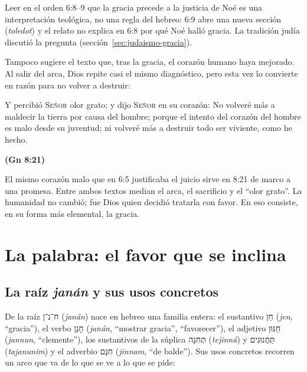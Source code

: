 \documentclass[11pt,letterpaper]{article}
\newcommand{\heb}[1]{\mbox{\foreignlanguage{hebrew}{#1}}}
\newcommand{\SENOR}{\textsc{Señor}}
\newcommand{\fuente}[1]{\par\hfill{\upshape\bfseries\small\textcolor{azul}{#1}}}
\begin{document}
\begin{nota}[Precisión]
Leer en el orden 6:8--9 que la gracia precede a la justicia de Noé es una interpretación teológica, no una regla del hebreo: 6:9 abre una nueva sección (\emph{toledot}) y el relato no explica en 6:8 por qué Noé halló gracia. La tradición judía discutió la pregunta (sección~\ref{sec:judaismo-gracia}).
\end{nota}

Tampoco sugiere el texto que, tras la gracia, el corazón humano haya mejorado. Al salir del arca, Dios repite casi el mismo diagnóstico, pero esta vez lo convierte en razón para no volver a destruir:

\begin{cita}Y percibió \SENOR{} olor grato; y dijo \SENOR{} en su corazón: No volveré más a maldecir la tierra por causa del hombre; porque el intento del corazón del hombre es malo desde su juventud; ni volveré más a destruir todo ser viviente, como he hecho.\fuente{(Gn 8:21)}\end{cita}

El mismo corazón malo que en 6:5 justificaba el juicio sirve en 8:21 de marco a una promesa. Entre ambos textos median el arca, el sacrificio y el ``olor grato''. La humanidad no cambió; fue Dios quien decidió tratarla con favor. En eso consiste, en su forma más elemental, la gracia.

\section{La palabra: el favor que se inclina}

\subsection{La raíz \emph{janán} y sus usos concretos}
De la raíz \heb{ח־נ־ן} (\emph{janán}) nace en hebreo una familia entera: el sustantivo \heb{חֵן} (\emph{jen}, ``gracia''), el verbo \heb{חָנַן} (\emph{janán}, ``mostrar gracia'', ``favorecer''), el adjetivo \heb{חַנּוּן} (\emph{jannun}, ``clemente''), los sustantivos de la súplica \heb{תְּחִנָּה} (\emph{tejinná}) y \heb{תַּחֲנוּנִים} (\emph{tajanunim}) y el adverbio \heb{חִנָּם} (\emph{jinnam}, ``de balde''). Sus usos concretos recorren un arco que va de lo que se ve a lo que se pide:
\end{document}
